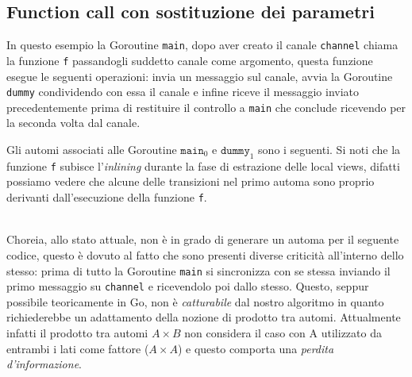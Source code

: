 \subsection{Function call con sostituzione dei parametri}
In questo esempio la Goroutine \texttt{main}, dopo aver creato il canale \texttt{channel} chiama la funzione \texttt{f} passandogli suddetto canale come argomento, questa funzione esegue le seguenti operazioni: invia un messaggio sul canale, avvia la Goroutine \texttt{dummy} condividendo con essa il canale e infine riceve il messaggio inviato precedentemente prima di restituire il controllo a \texttt{main} che conclude ricevendo per la seconda volta dal canale.
\newpage %

Gli automi associati alle Goroutine $\texttt{main}_0$ e $\texttt{dummy}_1$ sono i seguenti. Si noti che la funzione \texttt{f} subisce l'\emph{inlining} durante la fase di estrazione delle local views, difatti possiamo vedere che alcune delle transizioni nel primo automa sono proprio derivanti dall'esecuzione della funzione \texttt{f}.
\begin{figure}[h!]
\end{figure}\\
Choreia, allo stato attuale, non è in grado di generare un automa per il seguente codice, questo è dovuto al fatto che sono presenti diverse criticità all'interno dello stesso: prima di tutto la Goroutine \texttt{main} si sincronizza con se stessa inviando il primo messaggio su \texttt{channel} e ricevendolo poi dallo stesso. Questo, seppur possibile teoricamente in Go, non è \emph{catturabile} dal nostro algoritmo in quanto richiederebbe un adattamento della nozione di prodotto tra automi. Attualmente infatti il prodotto tra automi $A \times B$ non considera il caso con A utilizzato da entrambi i lati come fattore ($A \times A$) e questo comporta una \emph{perdita d'informazione}.\\
